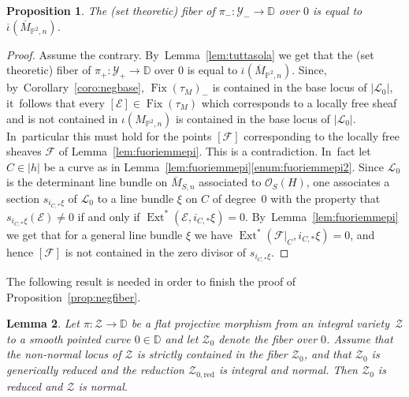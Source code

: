 \documentclass[JEP,XML,SOM,Unicode,published]{cedram}
\newcommand{\DD}{{\mathbb D}}
\newcommand{\PP}{{\mathbb P}}\let\P\PP
\newcommand\cE{\mathcal{E}}
\newcommand\cF{\mathcal{F}}
\newcommand\cL{\mathcal{L}}
\newcommand\cO{\mathcal{O}}
\newcommand\cY{\mathcal{Y}}
\DeclareMathOperator{\Ext}{Ext}
\DeclareMathOperator{\Fix}{Fix}
\let\ov\overline
\newtheorem{lemm}{Lemma}[section]
\newtheorem{prop}[lemm]{Proposition}
\theoremstyle{definition}
\begin{document}
\begin{prop}\label{prop:tuttasola}
The (set theoretic) fiber of $\pi_{-}\colon\cY_{-}\to\DD$ over $0$ is equal to $\ov{\iota}(\ov{M}_{\PP^2,n})$.
\end{prop}

\begin{proof}
Assume the contrary. By~Lemma~\ref{lem:tuttasola} we get that the (set theoretic) fiber of $\pi_{+}\colon\cY_{+}\to\DD$ over $0$ is equal to
$\ov{\iota}(\ov{M}_{\PP^2,n})$. Since, by~Corollary~\ref{coro:negbase}, $\Fix(\tau_M)_{-}$ is contained in the base locus of $|\cL_0|$, it~follows that every $[\cE]\in \Fix(\tau_M)$ which corresponds to a locally free sheaf and is not contained
in $\iota(M_{\PP^2,n})$ is contained in the base locus of $|\cL_0|$. In~particular this must hold for the points $[\cF]$ corresponding to the locally free sheaves $\cF$ of Lemma~\ref{lem:fuoriemmepi}. This is a contradiction. In~fact let $C\in|h|$ be a curve as in Lemma~\ref{lem:fuoriemmepi}\eqref{enum:fuoriemmepi2}.
Since $\cL_0$ is the determinant line bundle on $\ov{M}_{S,n}$ associated to $\cO_S(H)$, one associates a section $s_{i_{C,*}\xi}$ of $\cL_0$ to a line bundle $\xi$ on $C$ of degree~0 with the property
that $s_{i_{C,*}\xi}(\cE)\neq 0$ if and only if $\Ext^*(\cE,i_{C,*}\xi)=0$. By~Lemma~\ref{lem:fuoriemmepi} we get that for a general line bundle $\xi$
we have $\Ext^*(\cF\vert_{C},i_{C,*}\xi)=0$, and hence $[\cF]$ is not contained in the zero divisor of
$s_{i_{C,*}\xi}$.
\end{proof}

The following result is needed in order to finish the proof of Proposition~\ref{prop:negfiber}.

\begin{lemm}\label{lem:NormalityImpliesReduced}
Let $\pi\colon \mathcal{Z} \to \DD$ be a flat projective morphism from an integral variety~$\mathcal{Z}$ to a smooth pointed curve $0 \in \DD$ and let $\mathcal{Z}_0$ denote the fiber over $0$.
Assume that the non-normal locus of $\mathcal{Z}$ is strictly contained in the fiber $\mathcal{Z}_0$, and that $\mathcal{Z}_0$ is generically reduced and the reduction $\mathcal{Z}_{0,\mathrm{red}}$ is integral and normal.
Then $\mathcal{Z}_0$ is reduced and $\mathcal{Z}$ is normal.
\end{lemm}
\end{document}

